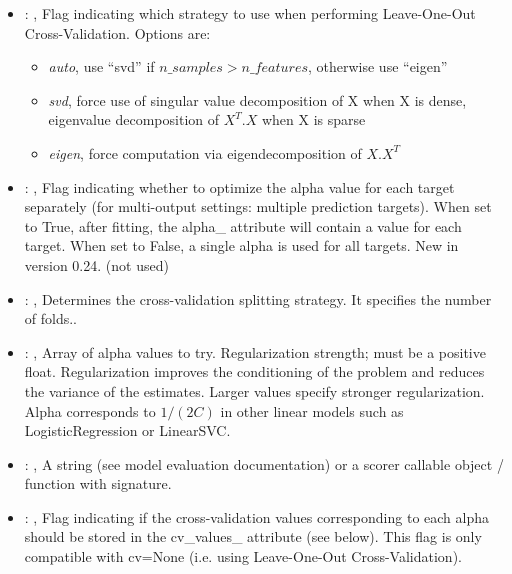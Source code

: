 \begin{itemize}
    \item {}: ,
      Flag indicating which strategy to use when performing Leave-One-Out Cross-Validation.
      Options are:                                                  \begin{itemize}
      \item \textit{auto}, use ``svd'' if $n\_samples > n\_features$, otherwise use ``eigen''
      \item \textit{svd}, force use of singular value decomposition of X when X is
      dense, eigenvalue decomposition of $X^T.X$ when X is sparse
      \item \textit{eigen}, force computation via eigendecomposition of $X.X^T$
      \end{itemize}

    \item {}: ,
      Flag indicating whether to optimize the alpha value for each target separately
      (for multi-output settings: multiple prediction targets). When set to True, after fitting,
      the alpha\_ attribute will contain a value for each target. When set to False, a single alpha
      is used for all targets. New in version 0.24. (not used)

    \item {}: ,
      Determines the cross-validation splitting strategy.
      It specifies the number of folds..

    \item {}: ,
      Array of alpha values to try. Regularization strength; must be a positive float.
      Regularization                                                  improves the conditioning of
      the problem and reduces the variance of the estimates.
      Larger values specify stronger regularization. Alpha corresponds to $1 / (2C)$ in other
      linear models such as LogisticRegression or LinearSVC.

    \item {}: ,
      A string (see model evaluation documentation) or a scorer
      callable object / function with signature.

    \item {}: ,
      Flag indicating if the cross-validation values corresponding
      to each alpha should be stored in the cv\_values\_ attribute (see below).
      This flag is only compatible with cv=None (i.e. using Leave-One-Out
      Cross-Validation).
  \end{itemize}


